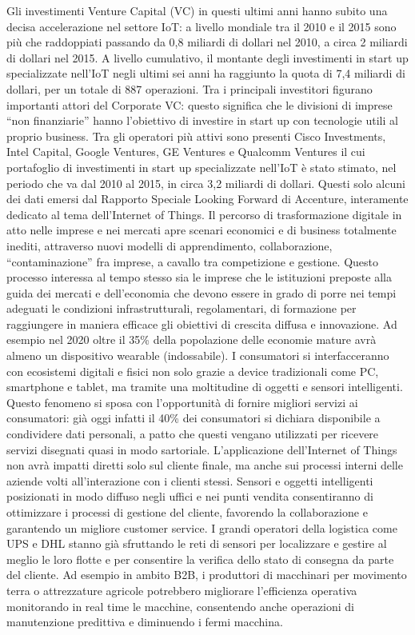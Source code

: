 \documentclass[a4paper]{report} %
\begin{document}
Gli investimenti Venture Capital (VC) in questi ultimi anni hanno subito una decisa accelerazione nel settore IoT: a livello mondiale tra il 2010 e il 2015 sono più che raddoppiati passando da 0,8 miliardi di dollari nel 2010, a circa 2 miliardi di dollari nel 2015. A livello cumulativo, il montante degli investimenti in start up specializzate nell’IoT negli ultimi sei anni ha raggiunto la quota di 7,4 miliardi di dollari, per un totale di 887 operazioni. Tra i principali investitori figurano importanti attori del Corporate VC: questo significa che le divisioni di imprese “non finanziarie” hanno l’obiettivo di investire in start up con tecnologie utili al proprio business. Tra gli operatori più attivi sono presenti Cisco Investments, Intel Capital, Google Ventures, GE Ventures e Qualcomm Ventures il cui portafoglio di investimenti in start up specializzate nell’IoT è stato stimato, nel periodo che va dal 2010 al 2015, in circa 3,2 miliardi di dollari. Questi solo alcuni dei dati emersi dal Rapporto Speciale Looking Forward di Accenture, interamente dedicato al tema dell’Internet of Things.
Il percorso di trasformazione digitale in atto nelle imprese e nei mercati apre scenari economici e di business totalmente inediti, attraverso nuovi modelli di apprendimento, collaborazione, “contaminazione” fra imprese, a cavallo tra competizione e gestione. Questo processo interessa al tempo stesso sia le imprese che le istituzioni preposte alla guida dei mercati e dell’economia che devono essere in grado di porre nei tempi adeguati le condizioni infrastrutturali, regolamentari, di formazione per raggiungere in maniera efficace gli obiettivi di crescita diffusa e innovazione. Ad esempio nel 2020 oltre il 35\% della popolazione delle economie mature avrà almeno un dispositivo wearable (indossabile). I consumatori si interfacceranno con ecosistemi digitali e fisici non solo grazie a device tradizionali come PC, smartphone e tablet, ma tramite una moltitudine di oggetti e sensori intelligenti. Questo fenomeno si sposa con l’opportunità di fornire migliori servizi ai consumatori: già oggi infatti il 40\% dei consumatori si dichiara disponibile a condividere dati personali, a patto che questi vengano utilizzati per ricevere servizi disegnati quasi in modo sartoriale. L’applicazione dell’Internet of Things non avrà impatti diretti solo sul cliente finale, ma anche sui processi interni delle aziende volti all’interazione con i clienti stessi. Sensori e oggetti intelligenti posizionati in modo diffuso negli uffici e nei punti vendita consentiranno di ottimizzare i processi di gestione del cliente, favorendo la collaborazione e garantendo un migliore customer service. I grandi operatori della logistica come UPS e DHL stanno già sfruttando le reti di sensori per localizzare e gestire al meglio le loro flotte e per consentire la verifica dello stato di consegna da parte del cliente. Ad esempio in ambito B2B, i produttori di macchinari per movimento terra o attrezzature agricole potrebbero migliorare l’efficienza operativa monitorando in real time le macchine, consentendo anche operazioni di manutenzione predittiva e diminuendo i fermi macchina. 
\end{document}
